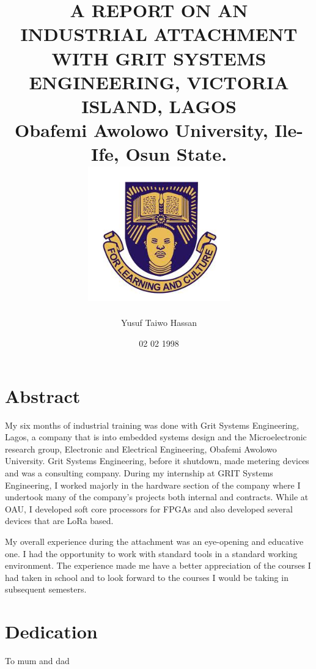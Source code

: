 \documentclass[12pt,twoside]{report}
\begin{document}
\title{
A REPORT ON
AN INDUSTRIAL ATTACHMENT WITH
GRIT SYSTEMS ENGINEERING,
VICTORIA ISLAND, LAGOS\\
{\large Obafemi Awolowo University, Ile-Ife, Osun State.}\\
{\includegraphics{university.png}}
}
\author{Yusuf Taiwo Hassan}
\date{02 02 1998}

\maketitle

\chapter*{Abstract}
My six months of industrial training was done with Grit Systems Engineering,
Lagos, a company that is into embedded systems design and the Microelectronic research group, Electronic and Electrical Engineering, Obafemi Awolowo University. Grit Systems Engineering, before it shutdown, made metering devices and was a consulting company.
During my internship at GRIT Systems Engineering, I worked majorly in the hardware section of the company
where I undertook many of the company's projects both internal and contracts. While at OAU, I developed soft core processors for FPGAs and also developed several devices that are LoRa based.

My overall experience during the attachment was an eye-opening and educative one. I
had the opportunity to work with standard tools in a standard working environment.
The experience made me have a better appreciation of the courses I had taken in
school and to look forward to the courses I would be taking in subsequent semesters.
 
\chapter*{Dedication}
To mum and dad
\end{document}
